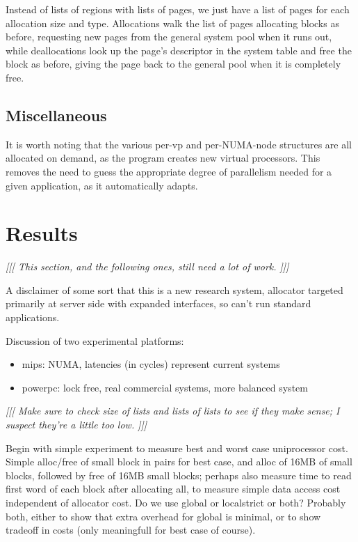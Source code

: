 \documentclass[dvips,11pt]{article}
\newcommand\fixnote[1]{\emph{[[[ #1 ]]]}}
\begin{document}
Instead of lists of regions with lists of pages, we just have a list of
pages for each allocation size and type.  Allocations walk the list of
pages allocating blocks as before, requesting new pages from the general
system pool when it runs out, while deallocations look up the page's
descriptor in the system table and free the block as before, giving the
page back to the general pool when it is completely free.

\subsection{Miscellaneous}

It is worth noting that the various per-vp and per-NUMA-node structures are 
all allocated on demand, as the program creates new virtual processors.
This removes the need to guess the appropriate degree of parallelism needed 
for a given application, as it automatically adapts.



\section{Results}

\fixnote{This section, and the following ones, still need a lot of work.}

A disclaimer of some sort that this is a new research system, allocator
targeted primarily at server side with expanded interfaces, so can't run
standard applications.

Discussion of two experimental platforms:
\begin{itemize}
\item mips: NUMA, latencies (in cycles) represent current systems
\item powerpc: lock free, real commercial systems, more balanced system
\end{itemize}

\fixnote{Make sure to check size of lists and lists of lists to see if they 
  make sense; I suspect they're a little too low.}

Begin with simple experiment to measure best and worst case uniprocessor
cost.  Simple alloc/free of small block in pairs for best case, and alloc
of 16MB of small blocks, followed by free of 16MB small blocks; perhaps
also measure time to read first word of each block after allocating all, to
measure simple data access cost independent of allocator cost.  Do we use
global or localstrict or both?  Probably both, either to show that extra
overhead for global is minimal, or to show tradeoff in costs (only
meaningfull for best case of course).
\end{document}
